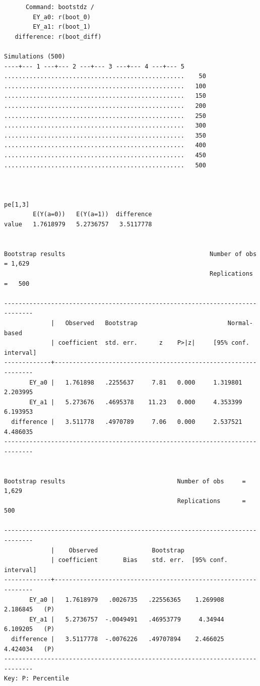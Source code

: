 \documentclass[
  10pt,
]{book}
\begin{document}
\begin{verbatim}
      Command: bootstdz /
        EY_a0: r(boot_0)
        EY_a1: r(boot_1)
   difference: r(boot_diff)

Simulations (500)
----+--- 1 ---+--- 2 ---+--- 3 ---+--- 4 ---+--- 5 
..................................................    50
..................................................   100
..................................................   150
..................................................   200
..................................................   250
..................................................   300
..................................................   350
..................................................   400
..................................................   450
..................................................   500



pe[1,3]
        E(Y(a=0))   E(Y(a=1))  difference
value   1.7618979   5.2736757   3.5117778


Bootstrap results                                        Number of obs = 1,629
                                                         Replications  =   500

------------------------------------------------------------------------------
             |   Observed   Bootstrap                         Normal-based
             | coefficient  std. err.      z    P>|z|     [95% conf. interval]
-------------+----------------------------------------------------------------
       EY_a0 |   1.761898   .2255637     7.81   0.000     1.319801    2.203995
       EY_a1 |   5.273676   .4695378    11.23   0.000     4.353399    6.193953
  difference |   3.511778   .4970789     7.06   0.000     2.537521    4.486035
------------------------------------------------------------------------------


Bootstrap results                               Number of obs     =      1,629
                                                Replications      =        500

------------------------------------------------------------------------------
             |    Observed               Bootstrap
             | coefficient       Bias    std. err.  [95% conf. interval]
-------------+----------------------------------------------------------------
       EY_a0 |   1.7618979   .0026735   .22556365    1.269908   2.186845   (P)
       EY_a1 |   5.2736757  -.0049491   .46953779     4.34944   6.109205   (P)
  difference |   3.5117778  -.0076226   .49707894    2.466025   4.424034   (P)
------------------------------------------------------------------------------
Key: P: Percentile
\end{verbatim}
\end{document}

